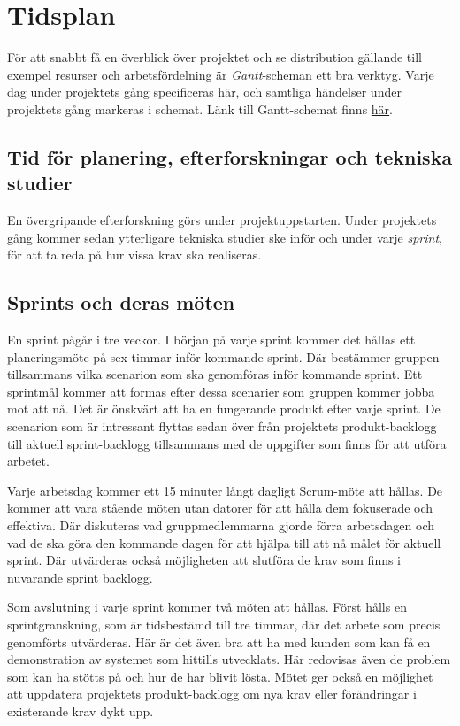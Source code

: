\documentclass[a4paper,12pt,oneside,final]{extbook}
\begin{document}
\chapter{Tidsplan}

För att snabbt få en överblick över projektet och se distribution
gällande till exempel resurser och arbetsfördelning är \emph{Gantt}-scheman
ett bra verktyg. Varje dag under projektets gång specificeras här,
och samtliga händelser under projektets gång markeras i schemat.
Länk till Gantt-schemat finns \href{http://goo.gl/dL0ydY}{här}.

\section{Tid för planering, efterforskningar och tekniska studier}
En övergripande efterforskning görs under projektuppstarten. Under
projektets gång kommer sedan ytterligare tekniska studier ske inför
och under varje \emph{sprint}, för att ta reda på hur vissa krav ska realiseras.

\section{Sprints och deras möten}
\label{sprintomoten}
En sprint pågår i tre veckor. I början på varje sprint kommer det
hållas ett planeringsmöte på sex timmar inför kommande sprint. Där
bestämmer gruppen tillsammans vilka scenarion som ska genomföras inför
kommande sprint. Ett sprintmål kommer att formas efter dessa
scenarier som gruppen kommer jobba mot att nå. Det är önskvärt
att ha en fungerande produkt efter varje sprint. De scenarion som
är intressant flyttas sedan över från projektets produkt-backlogg
till aktuell sprint-backlogg tillsammans med de uppgifter som finns
för att utföra arbetet.

Varje arbetsdag kommer ett 15 minuter långt dagligt Scrum-möte att hållas.
De kommer att vara stående möten utan datorer för att hålla dem
fokuserade och effektiva. Där diskuteras vad gruppmedlemmarna
gjorde förra arbetsdagen och vad de ska göra den kommande dagen
för att hjälpa till att nå målet för aktuell sprint. Där utvärderas
också möjligheten att slutföra de krav som finns i nuvarande
sprint backlogg.

Som avslutning i varje sprint kommer två möten att hållas. Först
hålls en sprintgranskning, som är tidsbestämd till tre timmar, där
det arbete som precis genomförts utvärderas. Här är det även bra
att ha med kunden som kan få en demonstration av systemet som
hittills utvecklats. Här redovisas även de problem som kan ha
stötts på och hur de har blivit lösta. Mötet ger också en möjlighet
att uppdatera projektets produkt-backlogg om nya krav eller
förändringar i existerande krav dykt upp.
\end{document}
